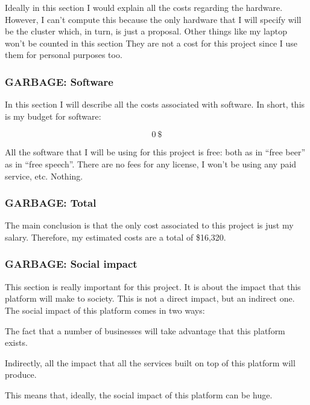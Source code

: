 Ideally in this section I would explain all the costs regarding the hardware.
However, I can't compute this because the only hardware that I will specify will
be the cluster which, in turn, is just a proposal. Other things like my laptop
won't be counted in this section They are not a cost for this project since I
use them for personal purposes too.

\subsubsection{GARBAGE: Software}

In this section I will describe all the costs associated with software. In
short, this is my budget for software:

\[
  0\ \$
\]

All the software that I will be using for this project is free: both as in
``free beer'' as in ``free speech''. There are no fees for any license, I won't
be using any paid service, etc. Nothing.

\subsubsection{GARBAGE: Total}

The main conclusion is that the only cost associated to this project is just my
salary. Therefore, my estimated costs are a total of \$16,320.

\subsubsection{GARBAGE: Social impact}

This section is really important for this project. It is about the impact that
this platform will make to society. This is not a direct impact, but an
indirect one. The social impact of this platform comes in two ways:

\mylist
  \item The fact that a number of businesses will take advantage that this
platform exists.
  \item Indirectly, all the impact that all the services built on top of this
platform will produce.
\mylistend

This means that, ideally, the social impact of this platform can be huge.

